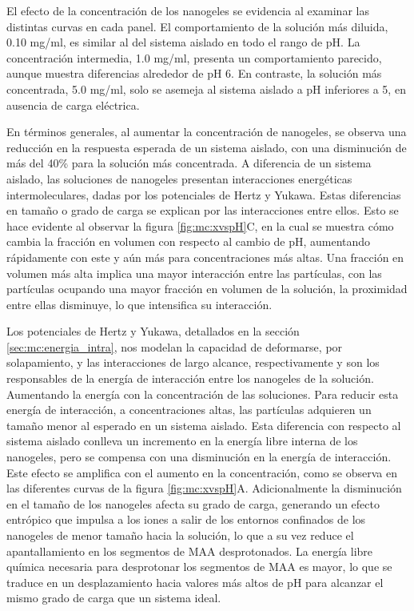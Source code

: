 	El efecto de la concentraci\'on de los nanogeles se evidencia al examinar las distintas curvas en cada panel. El comportamiento de la soluci\'on m\'as diluida, 0.10 mg/ml, es similar al del sistema aislado en todo el rango de pH. La concentraci\'on intermedia, 1.0 mg/ml, presenta un comportamiento parecido, aunque muestra diferencias alrededor de pH 6. En contraste, la soluci\'on m\'as concentrada, 5.0 mg/ml, solo se asemeja al sistema aislado a pH inferiores a 5, en ausencia de carga el\'ectrica.
	
	En t\'erminos generales, al aumentar la concentraci\'on de nanogeles, se observa una reducci\'on en la respuesta esperada de un sistema aislado, con una disminuci\'on de m\'as del 40\% para la soluci\'on m\'as concentrada. A diferencia de un sistema aislado, las soluciones de nanogeles presentan interacciones energ\'eticas intermoleculares, dadas por los potenciales de Hertz y Yukawa. Estas diferencias en tama\~no o grado de carga se explican por las interacciones entre ellos. Esto se hace evidente al observar la figura \ref{fig:mc:xvspH}C, en la cual se muestra c\'omo cambia la fracci\'on en volumen con respecto al cambio de pH, aumentando r\'apidamente con este y a\'un m\'as para concentraciones m\'as altas. Una fracci\'on en volumen m\'as alta implica una mayor interacci\'on entre las part\'iculas, con las part\'iculas ocupando una mayor fracci\'on en volumen de la soluci\'on, la proximidad entre ellas disminuye, lo que intensifica su interacci\'on.
	
	Los potenciales de Hertz y Yukawa, detallados en la secci\'on \ref{sec:mc:energia_intra}, nos modelan  la capacidad de deformarse, por solapamiento, y las interacciones de largo alcance, respectivamente y son los responsables de la energ\'ia de interacci\'on entre los nanogeles de la soluci\'on. Aumentando la energ\'ia con la concentraci\'on de las soluciones.
	Para reducir esta energ\'ia de interacci\'on, a concentraciones altas,  las part\'iculas adquieren un tama\~no menor al esperado en un sistema aislado. Esta diferencia con respecto al sistema aislado conlleva un incremento en la energ\'ia libre interna de los nanogeles, pero se compensa con una disminuci\'on en la energ\'ia de interacci\'on. Este efecto se amplifica con el aumento en la concentraci\'on, como se observa en las diferentes curvas de la figura \ref{fig:mc:xvspH}A. 
	Adicionalmente la disminuci\'on en el tama\~no de los nanogeles afecta su grado de carga, generando un efecto entr\'opico que impulsa a los iones a salir de los entornos confinados de los nanogeles de menor tama\~no hacia la soluci\'on, lo que a su vez reduce el apantallamiento en los segmentos de MAA desprotonados. La energ\'ia libre qu\'imica necesaria para desprotonar los segmentos de MAA es mayor, lo que se traduce en un desplazamiento hacia valores m\'as altos de pH para alcanzar el mismo grado de carga que un sistema ideal.
	
